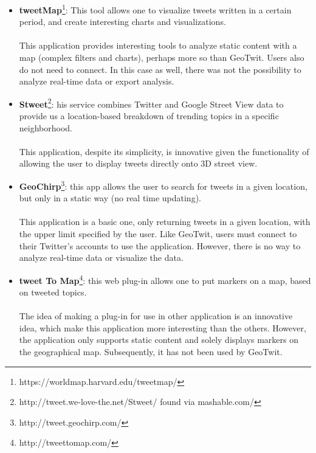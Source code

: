 \documentclass[a4paper,11pt]{report}
\begin{document}
\begin{itemize}
	\item \textbf{tweetMap}\footnote{https://worldmap.harvard.edu/tweetmap/}: This tool allows one to visualize tweets written in a certain period, and create interesting charts and visualizations.\\\\
	This application provides interesting tools to analyze static content with a map (complex filters and charts), perhaps more so than GeoTwit. Users also do not need to connect. In this case as well, there was not the possibility to analyze real-time data or export analysis.
	\item \textbf{Stweet}\footnote{http://tweet.we-love-the.net/Stweet/ found via mashable.com/}: his service combines Twitter and Google Street View data to provide us a location-based breakdown of trending topics in a specific neighborhood.\\\\
	This application, despite its simplicity, is innovative given the functionality of allowing the user to display tweets directly onto 3D street view.
	\item \textbf{GeoChirp}\footnote{http://tweet.geochirp.com/}: this app allows the user to search for tweets in a given location, but only in a static way (no real time updating).\\\\
This application is a basic one, only returning tweets in a given location, with the upper limit specified by the user. Like GeoTwit, users must connect to their Twitter's accounts to use the application. However, there is no way to analyze real-time data or visualize the data.
	\item \textbf{tweet To Map}\footnote{http://tweettomap.com/}: this web plug-in allows one to put markers on a map, based on tweeted topics.\\\\
	The idea of making a plug-in for use in other application is an innovative idea, which make this application more interesting than the others. However, the application only supports static content and solely displays markers on the geographical map. Subsequently, it has not been used by GeoTwit.
\end{itemize}
\bigskip
\end{document}
